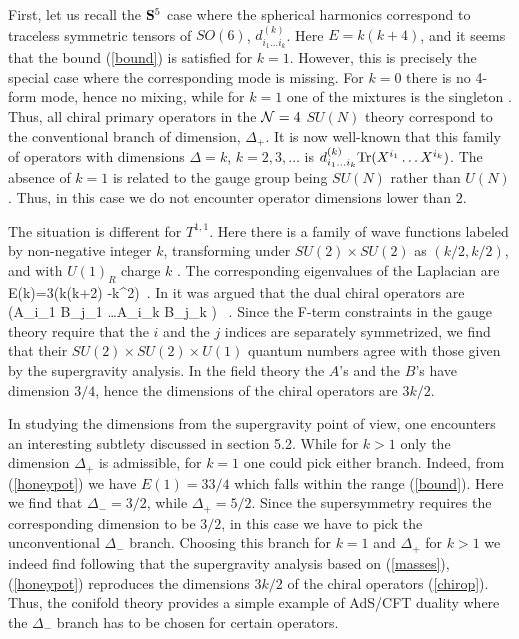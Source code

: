 \documentclass[12pt]{article}
\begin{document}
First, let us recall the ${\bf S}^5$ case where the spherical
harmonics correspond to
traceless symmetric tensors of $SO(6)$, $d^{(k)}_{i_1\ldots i_k}$. 
Here $E= k(k+4)$, and it seems that
the bound (\ref{bound}) is satisfied for $k=1$. However, this is precisely the
special case where the corresponding mode is missing.
For $k=0$ there is no 4-form mode, hence no
mixing, while for $k=1$ one of the mixtures is the singleton \cite{Kim}.
Thus, all chiral primary 
operators in the ${\cal N}=4$ $SU(N)$ theory correspond to
the conventional branch of dimension, $\Delta_+$.
It is now well-known that this family of operators with dimensions
$\Delta= k$, $k=2,3,\ldots$
is $d^{(k)}_{i_1\ldots i_k} {\rm Tr} (X^{i_1} \ldots X^{i_k})$.
The absence of $k=1$ is related to the gauge group being $SU(N)$ rather
than $U(N)$. Thus, in this case we do not encounter operator
dimensions lower than $2$.

The situation is different for $T^{1,1}$. Here there is a family of wave
functions labeled by non-negative integer $k$, transforming under 
$SU(2)\times SU(2)$  as $(k/2,k/2)$, and with
$U(1)_R$ charge $k$ \cite{Gubser,RD,Ceres}.
The corresponding eigenvalues of the Laplacian
are 
\be \label{honeypot}
E(k)=3\left(k(k+2)
-{k^2}\right)\
.
\ee
In \cite{KW} it was argued that the dual chiral operators are
\be \label{chirop}
\tr (A_{i_1} B_{j_1} \ldots A_{i_k} B_{j_k} )
\ .
\ee
Since the F-term constraints in the gauge theory require that the
$i$ and the $j$ indices are separately symmetrized, we find that
their $SU(2)\times SU(2)\times U(1)$ quantum numbers agree with those
given by the supergravity analysis. In the field theory
the $A$'s and the $B$'s have dimension $3/4$, hence the dimensions
of the chiral operators are $3k/2$.

In studying the dimensions from the supergravity point of view, one encounters
an interesting subtlety discussed in section 5.2. While for $k>1$ only
the dimension $\Delta_+$ is admissible, for $k=1$ one could pick either 
branch. Indeed, from (\ref{honeypot}) we have
$E(1)=33/4$ which falls within the range (\ref{bound}). Here we
find that $\Delta_-=3/2$, while $\Delta_+=5/2$. Since the supersymmetry 
requires the corresponding dimension to be $3/2$, in this case
we have to pick the unconventional $\Delta_-$ branch. Choosing this
branch for $k=1$ and $\Delta_+$ for $k>1$ we indeed find
following \cite{Gubser,RD,Ceres}
that the supergravity analysis based on (\ref{masses}), (\ref{honeypot})
reproduces the dimensions $3k/2$ of the chiral operators (\ref{chirop}).
Thus, the conifold theory provides
a simple example of AdS/CFT duality where the $\Delta_-$ branch
has to be chosen for certain operators.
\end{document}
